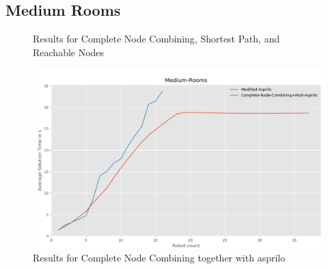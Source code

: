 \documentclass[runningheads]{llncs}
\begin{document}
\subsection{Medium Rooms}
\begin{figure}[H]
\caption{Results for Complete Node Combining, Shortest Path, and Reachable Nodes}
\end{figure}
\begin{figure}[H]
\includegraphics[scale=0.4]{Images/Results-Medium-Rooms-2}
\caption{Results for Complete Node Combining together with asprilo}
\end{figure}
\end{document}
